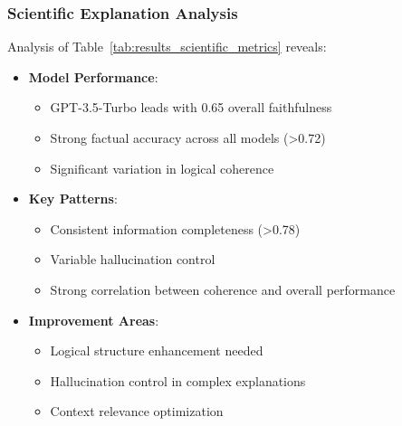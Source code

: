 \subsubsection{Scientific Explanation Analysis}
Analysis of Table~\ref{tab:results_scientific_metrics} reveals:
\begin{itemize}
    \item \textbf{Model Performance}:
    \begin{itemize}
        \item GPT-3.5-Turbo leads with 0.65 overall faithfulness
        \item Strong factual accuracy across all models (>0.72)
        \item Significant variation in logical coherence
    \end{itemize}
    \item \textbf{Key Patterns}:
    \begin{itemize}
        \item Consistent information completeness (>0.78)
        \item Variable hallucination control
        \item Strong correlation between coherence and overall performance
    \end{itemize}
    \item \textbf{Improvement Areas}:
    \begin{itemize}
        \item Logical structure enhancement needed
        \item Hallucination control in complex explanations
        \item Context relevance optimization
    \end{itemize}
\end{itemize}

